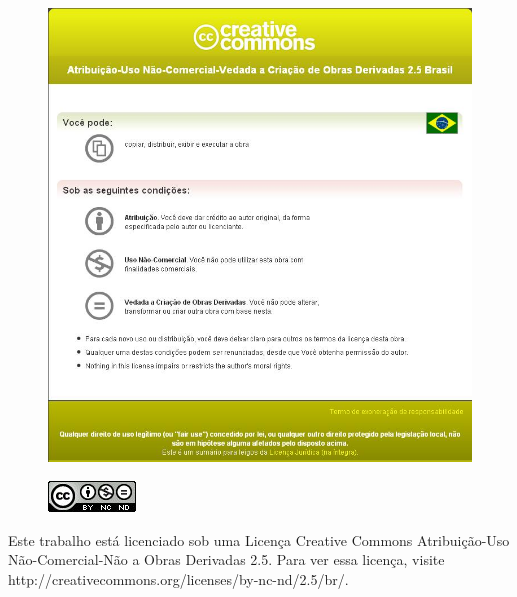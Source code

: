\begin{figure}[ht]
  \centering
  \includegraphics[scale=0.675]{img/creative}
\end{figure}

\begin{figure}[hb]
  \centering
  \includegraphics{img/cc}
\end{figure}

\begin{center}
 \vfill Este trabalho está licenciado sob uma Licença Creative Commons Atribuição-Uso Não-Comercial-Não a Obras Derivadas 2.5. Para ver essa licença, visite http://creativecommons.org/licenses/by-nc-nd/2.5/br/.
\end{center}